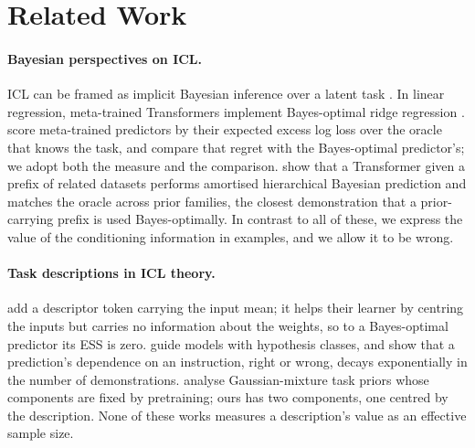 \documentclass[10pt]{article}
\begin{document}
\section{Related Work}

\paragraph{Bayesian perspectives on ICL.}
ICL can be framed as implicit Bayesian inference over a latent task \citep{xie2022}. In linear regression, meta-trained Transformers implement Bayes-optimal ridge regression \citep{akyurek2023, raventos2023, panwar2024}. \citet{genewein2025} score meta-trained predictors by their expected excess log loss over the oracle that knows the task, and compare that regret with the Bayes-optimal predictor's; we adopt both the measure and the comparison. \citet{zhu2026} show that a Transformer given a prefix of related datasets performs amortised hierarchical Bayesian prediction and matches the oracle across prior families, the closest demonstration that a prior-carrying prefix is used Bayes-optimally. In contrast to all of these, we express the value of the conditioning information in examples, and we allow it to be wrong.

\paragraph{Task descriptions in ICL theory.}
\citet{huangge2025} add a descriptor token carrying the input mean; it helps their learner by centring the inputs but carries no information about the weights, so to a Bayes-optimal predictor its ESS is zero. \citet{lin2025} guide models with hypothesis classes, and \citet{tong2026} show that a prediction's dependence on an instruction, right or wrong, decays exponentially in the number of demonstrations. \citet{lin2024} analyse Gaussian-mixture task priors whose components are fixed by pretraining; ours has two components, one centred by the description. None of these works measures a description's value as an effective sample size.
\end{document}
